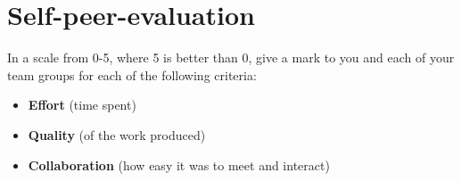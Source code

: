 \documentclass[11pt]{article}
\begin{document}




\section*{Self-peer-evaluation}
\begin{myExercise}
  In a scale from 0-5, where 5 is better than 0, give a mark to you and each of your team groups for each of the following criteria:
  \begin{itemize}
    \item \textbf{Effort} (time spent)
    \item \textbf{Quality} (of the work produced)
    \item \textbf{Collaboration} (how easy it was to meet and interact)
  \end{itemize}
\end{myExercise}


 
\end{document}
